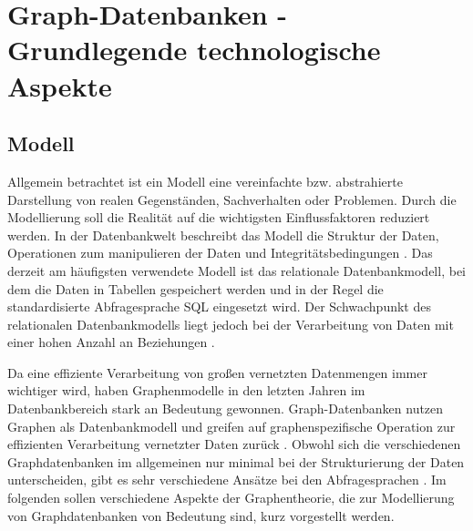 \chapter{Graph-Datenbanken - Grundlegende technologische Aspekte}
\section{Modell}
Allgemein betrachtet ist ein Modell eine vereinfachte bzw. abstrahierte Darstellung von realen Gegenständen, Sachverhalten oder Problemen.
Durch die Modellierung soll die Realität auf die wichtigsten Einflussfaktoren reduziert werden.
In der Datenbankwelt beschreibt das Modell die Struktur der Daten, Operationen zum manipulieren der Daten und Integritätsbedingungen \cite{efcodd}.
Das derzeit am häufigsten verwendete Modell ist das relationale Datenbankmodell, bei dem die Daten in Tabellen gespeichert werden und in der Regel die standardisierte Abfragesprache \ac{SQL} eingesetzt wird.
Der Schwachpunkt des relationalen Datenbankmodells liegt jedoch bei der Verarbeitung von Daten mit einer hohen Anzahl an Beziehungen \cite{vicknair2010comparison}.

Da eine effiziente Verarbeitung von großen vernetzten Datenmengen immer wichtiger wird, haben Graphenmodelle in den letzten Jahren im Datenbankbereich stark an Bedeutung gewonnen.
Graph-Datenbanken nutzen Graphen als Datenbankmodell und greifen auf graphenspezifische Operation zur effizienten Verarbeitung vernetzter Daten zurück \cite{angles2008survey}.
Obwohl sich die verschiedenen Graphdatenbanken im allgemeinen nur minimal bei der Strukturierung der Daten unterscheiden, gibt es sehr verschiedene Ansätze bei den Abfragesprachen \cite{anglesintro}.
Im folgenden sollen verschiedene Aspekte der Graphentheorie, die zur Modellierung von Graphdatenbanken von Bedeutung sind, kurz vorgestellt werden.

